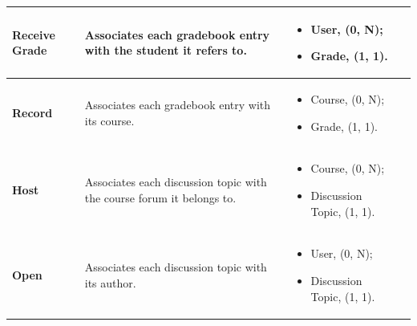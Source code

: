 {\begin{longtable}{|p{}|p{}|p{}|p{}|}
    \textbf{Receive Grade} & Associates each gradebook entry with the student it refers to. &
    \begin{itemize}[leftmargin=*,nosep,before=\vspace{-\baselineskip}\leavevmode,after=\vspace{-\baselineskip}]
        \item User, (0, N);
        \item Grade, (1, 1).
    \end{itemize}
    &
    
    \\ \hline

    \textbf{Record} & Associates each gradebook entry with its course. &
    \begin{itemize}[leftmargin=*,nosep,before=\vspace{-\baselineskip}\leavevmode,after=\vspace{-\baselineskip}]
        \item Course, (0, N);
        \item Grade, (1, 1).
    \end{itemize}
    &
    
    \\ \hline

    \textbf{Host} & Associates each discussion topic with the course forum it belongs to. &
    \begin{itemize}[leftmargin=*,nosep,before=\vspace{-\baselineskip}\leavevmode,after=\vspace{-\baselineskip}]
        \item Course, (0, N);
        \item Discussion Topic, (1, 1).
    \end{itemize}
    &
    
    \\ \hline

    \textbf{Open} & Associates each discussion topic with its author. &
    \begin{itemize}[leftmargin=*,nosep,before=\vspace{-\baselineskip}\leavevmode,after=\vspace{-\baselineskip}]
        \item User, (0, N);
        \item Discussion Topic, (1, 1).
    \end{itemize}
    &
    
    \\ \hline


\end{longtable}}
